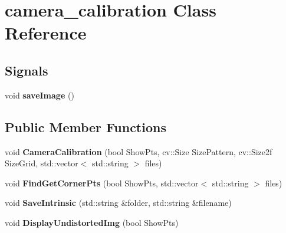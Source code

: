 \hypertarget{classcamera__calibration}{}\section{camera\+\_\+calibration Class Reference}
\label{classcamera__calibration}
\subsection*{Signals}
\begin{DoxyCompactItemize}
\item 
\hypertarget{classcamera__calibration_afdb838ba266a33ab8793fa473dfd5de4}{}void {\bfseries save\+Image} ()\label{classcamera__calibration_afdb838ba266a33ab8793fa473dfd5de4}

\end{DoxyCompactItemize}
\subsection*{Public Member Functions}
\begin{DoxyCompactItemize}
\item 
\hypertarget{classcamera__calibration_ae4efd033cabb573f7b29c06cd232c418}{}void {\bfseries Camera\+Calibration} (bool Show\+Pts, cv\+::\+Size Size\+Pattern, cv\+::\+Size2f Size\+Grid, std\+::vector$<$ std\+::string $>$ files)\label{classcamera__calibration_ae4efd033cabb573f7b29c06cd232c418}

\item 
\hypertarget{classcamera__calibration_a6a368ee81537f2affa81827a58bcca39}{}void {\bfseries Find\+Get\+Corner\+Pts} (bool Show\+Pts, std\+::vector$<$ std\+::string $>$ files)\label{classcamera__calibration_a6a368ee81537f2affa81827a58bcca39}

\item 
\hypertarget{classcamera__calibration_a465e652496ec382d61115205b52df4f2}{}void {\bfseries Save\+Intrinsic} (std\+::string \&folder, std\+::string \&filename)\label{classcamera__calibration_a465e652496ec382d61115205b52df4f2}

\item 
\hypertarget{classcamera__calibration_a23d697bb6dff6e69818067a3de785a49}{}void {\bfseries Display\+Undistorted\+Img} (bool Show\+Pts)\label{classcamera__calibration_a23d697bb6dff6e69818067a3de785a49}

\end{DoxyCompactItemize}
